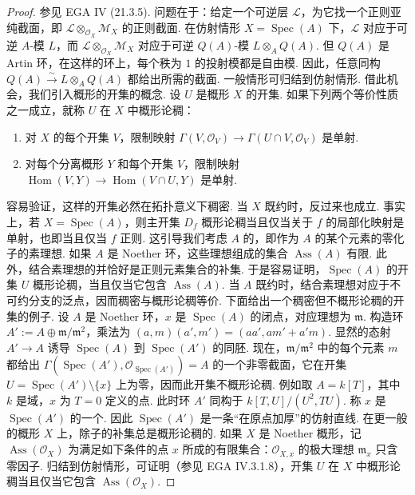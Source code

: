 \begin{proof}
参见 EGA IV (21.3.5). 问题在于：给定一个可逆层 $\mathcal L$，为它找一个正则亚纯截面，即 $\mathcal L\otimes_{\mathcal O_X}\mathcal M_X$ 的正则截面. 在仿射情形 $X=\operatorname{Spec}(A)$ 下，$\mathcal L$ 对应于可逆 $A$-模 $L$，而 $\mathcal L\otimes_{\mathcal O_X}\mathcal M_X$ 对应于可逆 $Q(A)$-模 $L\otimes_AQ(A)$. 但 $Q(A)$ 是 Artin 环，在这样的环上，每个秩为 $1$ 的投射模都是自由模. 因此，任意同构 $Q(A)\xrightarrow\sim L\otimes_AQ(A)$ 都给出所需的截面.
一般情形可归结到仿射情形. 借此机会，我们引入概形的开集的概念. 设 $U$ 是概形 $X$ 的开集. 如果下列两个等价性质之一成立，就称 $U$ 在 $X$ 中概形论稠：
\begin{enumerate}[label=\roman*)]
\item 对 $X$ 的每个开集 $V$，限制映射 $\Gamma(V,\mathcal O_V)\longrightarrow\Gamma(U\cap V,\mathcal O_V)$ 是单射.
\item 对每个分离概形 $Y$ 和每个开集 $V$，限制映射 $\operatorname{Hom}(V,Y)\longrightarrow\operatorname{Hom}(V\cap U,Y)$ 是单射.
\end{enumerate}
容易验证，这样的开集必然在拓扑意义下稠密. 当 $X$ 既约时，反过来也成立. 事实上，若 $X=\operatorname{Spec}(A)$，则主开集 $D_f$ 概形论稠当且仅当关于 $f$ 的局部化映射是单射，也即当且仅当 $f$ 正则. 这引导我们考虑 $A$ 的，即作为 $A$ 的某个元素的零化子的素理想. 如果 $A$ 是 Noether 环，这些理想组成的集合 $\operatorname{Ass}(A)$ 有限. 此外，结合素理想的并恰好是正则元素集合的补集. 于是容易证明，$\operatorname{Spec}(A)$ 的开集 $U$ 概形论稠，当且仅当它包含 $\operatorname{Ass}(A)$. 当 $A$ 既约时，结合素理想对应于不可约分支的泛点，因而稠密与概形论稠等价.
下面给出一个稠密但不概形论稠的开集的例子. 设 $A$ 是 Noether 环，$x$ 是 $\operatorname{Spec}(A)$ 的闭点，对应理想为 $\mathfrak m$. 构造环 $A':=A\oplus\mathfrak m/\mathfrak m^2$，乘法为 $(a,m)(a',m')=(aa',am'+a'm)$. 显然的态射 $A'\longrightarrow A$ 诱导 $\operatorname{Spec}(A)$ 到 $\operatorname{Spec}(A')$ 的同胚. 现在，$\mathfrak m/\mathfrak m^2$ 中的每个元素 $m$ 都给出 $\Gamma(\operatorname{Spec}(A'),\mathcal O_{\operatorname{Spec}(A')})=A$ 的一个非零截面，它在开集 $U=\operatorname{Spec}(A')\setminus\{x\}$ 上为零，因而此开集不概形论稠. 例如取 $A=k[T]$，其中 $k$ 是域，$x$ 为 $T=0$ 定义的点. 此时环 $A'$ 同构于 $k[T,U]/(U^2,TU)$. 称 $x$ 是 $\operatorname{Spec}(A')$ 的一个. 因此 $\operatorname{Spec}(A')$ 是一条``在原点加厚''的仿射直线.
在更一般的概形 $X$ 上，除子的补集总是概形论稠的. 如果 $X$ 是 Noether 概形，记 $\operatorname{Ass}(\mathcal O_X)$ 为满足如下条件的点 $x$ 所成的有限集合：$\mathcal O_{X,x}$ 的极大理想 $\mathfrak m_x$ 只含零因子. 归结到仿射情形，可证明（参见 EGA IV.3.1.8），开集 $U$ 在 $X$ 中概形论稠当且仅当它包含 $\operatorname{Ass}(\mathcal O_X)$.

\end{proof}
